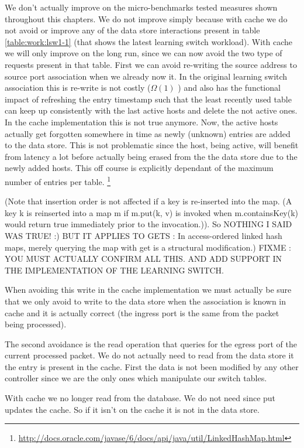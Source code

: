 \documentclass[12pt,openright,twoside]{report}
\begin{document}
We don't actually improve on the micro-benchmarks tested measures
shown throughout this chapters. We do not improve simply because with
cache we do not avoid or improve any of the data store interactions
present in table \ref{table:work:lsw1-1} (that shows the latest
learning switch workload).  With cache we will only improve on the
long run, since we can now avoid the two type of requests present in
that table. First we can avoid re-writing the source address to source
port association when we already now it. In the original learning
switch association this is re-write is not costly ($\Omega(1)$ ) and also
has the functional impact of refreshing the entry timestamp such that
the least recently used table can keep up consistently with the last
active hosts and delete the not active ones. In the cache
implementation this is not true anymore. Now, the active hosts
actually get forgotten somewhere in time as newly (unknown) entries
are added to the data store. This is not problematic since the host,
being active, will benefit from latency a lot before actually being
erased from the  the data store due to the newly added hosts. This off
course is explicitly dependant of the maximum number of entries per
table. 
\footnote{\url{http://docs.oracle.com/javase/6/docs/api/java/util/LinkedHashMap.html}}

(Note that insertion order is not affected if a key is re-inserted
into the map. (A key k is reinserted into a map m if m.put(k, v) is
invoked when m.containsKey(k) would return true immediately prior to
the invocation.)).  So NOTHING I SAID WAS TRUE! :) BUT IT APPLIES TO
GETS : In access-ordered linked hash maps, merely querying the map
with get is a structural modification.)
FIXME : YOU MUST ACTUALLY CONFIRM ALL THIS. AND ADD SUPPORT IN THE
IMPLEMENTATION OF THE LEARNING SWITCH. 

When avoiding this write
in the cache implementation we must actually be sure that we only
avoid to write to the data store when the association is known in
cache and it is actually correct (the ingress port is the same from
the packet being processed). 

The second avoidance is the read operation that queries for the egress
port of the current processed packet. We do not actually need to read
from the data store it the entry is present in the cache. First the
data is not been modified by any other controller since we are the only
ones which manipulate our switch tables. 


With cache we no longer read from the database. We do not need since
put updates the cache. So if it isn't on the cache it is not in the
data store.
\end{document}
